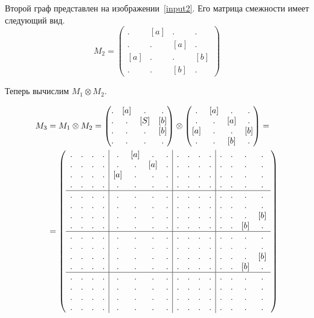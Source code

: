 Второй граф представлен на изображении~\ref{input2}. 
Его матрица смежности имеет следующий вид.
$$ M_2 =
\begin{pmatrix} 
. & [a] & . & . \\
. & . & [a] & . \\
[a] & . & . & [b] \\
. & . & [b] & . 
\end{pmatrix}
$$

Теперь вычислим $M_1 \otimes M_2$.

\begin{align}
M_3 &= M_1 \otimes M_2 = 
\begin{pmatrix} 
. & [a] & . & . \\
. & . & [S] & [b] \\
. & . & . & [b] \\
. & . & . & . 
\end{pmatrix}
\otimes 
\begin{pmatrix} 
. & [a] & . & . \\
. & . & [a] & . \\
[a] & . & . & [b] \\
. & . & [b] & . 
\end{pmatrix}
=\notag\\
&=
\left(\begin{array}{c c c c | c c c c | c c c c | c c c c } 
. & . & . & .  &  .   & [a] & .   & .  &  . & . & . & .  &  . & . & . & .   \\
. & . & . & .  &  .   & .   & [a] & .  &  . & . & . & .  &  . & . & . & .   \\
. & . & . & .  &  [a] & .   & .   & .  &  . & . & . & .  &  . & . & . & .   \\
. & . & . & .  &  .   & .   & .   & .  &  . & . & . & .  &  . & . & . & .   \\
\hline
. & . & . & .  &  . & . & . & .    &  . & . & . & .  &  . & . & . & .   \\
. & . & . & .  &  . & . & . & .    &  . & . & . & .  &  . & . & . & .   \\
. & . & . & .  &  . & . & . & .    &  . & . & . & .  &  . & . & . & [b] \\
. & . & . & .  &  . & . & . & .    &  . & . & . & .  &  . & . & [b] & . \\
\hline
. & . & . & .  &  . & . & . & .    &  . & . & . & .  &  . & . & . & .   \\
. & . & . & .  &  . & . & . & .    &  . & . & . & .  &  . & . & . & .   \\
. & . & . & .  &  . & . & . & .    &  . & . & . & .  &  . & . & . & [b] \\
. & . & . & .  &  . & . & . & .    &  . & . & . & .  &  . & . & [b] & . \\
\hline
. & . & . & .  &  . & . & . & .    &  . & . & . & .  &  . & . & . & .   \\
. & . & . & .  &  . & . & . & .    &  . & . & . & .  &  . & . & . & .   \\
. & . & . & .  &  . & . & . & .    &  . & . & . & .  &  . & . & . & .   \\
. & . & . & .  &  . & . & . & .    &  . & . & . & .  &  . & . & . & . 
\end{array}\right)
\label{eq:graph_tm}
\end{align}

